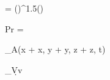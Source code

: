  = \left(\right)^{1.5}\left(\right)

Pr = 

_A(x + \Delta{}x, y + \Delta{}y, z + \Delta{}z, t)

\int_{V}\d{}v